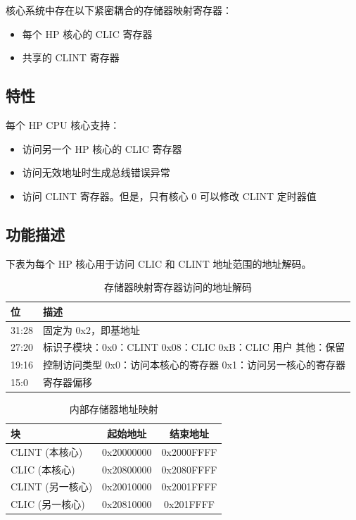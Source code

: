 \documentclass[main\_\_CN.tex]{subfiles}
\begin{document}
核心系统中存在以下紧密耦合的存储器映射寄存器：

\begin{itemize}
    \item 每个 HP 核心的 CLIC 寄存器
    \item 共享的 CLINT 寄存器
\end{itemize}

\subsection{特性}
\label{sec:riscvcpu-tcip-features}

每个 HP CPU 核心支持：
\begin{itemize}
    \item 访问另一个 HP 核心的 CLIC 寄存器
    \item 访问无效地址时生成总线错误异常
    \item 访问 CLINT 寄存器。但是，只有核心 0 可以修改 CLINT 定时器值
\end{itemize}

\subsection{功能描述}
\label{sec:riscvcpu-tcip-func-descr}

下表为每个 HP 核心用于访问 CLIC 和 CLINT 地址范围的地址解码。

\begin{longtable}{ | l | p{5 cm} | }
\caption{存储器映射寄存器访问的地址解码} \label{tab:riscvcpu-tcip-table}
\\ \hline
\rowcolor{lightgray}
位 & 描述 \\ \hline
31:28 & 固定为 0x2，即基地址 \\ \hline
27:20 & 标识子模块：\newline 0x0：CLINT \newline 0x08：CLIC \newline 0xB：CLIC 用户 \newline 其他：保留 \\ \hline
19:16 & 控制访问类型 \newline 0x0：访问本核心的寄存器 \newline 0x1：访问另一核心的寄存器\\ \hline
15:0 & 寄存器偏移 \\ \hline
\end{longtable}


\begin{longtable}{ | l | c | c |}
\caption{内部存储器地址映射} \label{tab:riscvcpu-tcip-slave-table}
\\ \hline
\rowcolor{lightgray}
块 & 起始地址 & 结束地址 \\ \hline
CLINT (本核心) & 0x20000000  &  0x2000FFFF\\ \hline
CLIC (本核心) & 0x20800000  &  0x2080FFFF\\ \hline
CLINT (另一核心) & 0x20010000  &  0x2001FFFF\\ \hline
CLIC (另一核心) & 0x20810000  &  0x201FFFF\\ \hline
\end{longtable}
\end{document}
